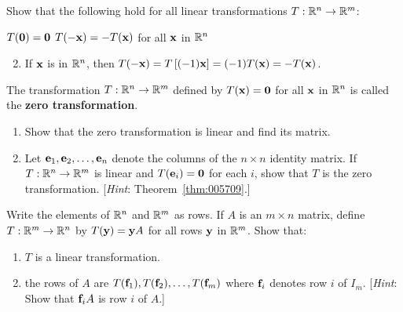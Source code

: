 \begin{multicols}{2}
\begin{ex}
Show that the following hold for all linear transformations $T : \mathbb{R}^n \to \mathbb{R}^m$:

\begin{exenumerate}[column-sep=-5em]
\exitem $T(\textbf{0}) = \textbf{0}$
\exitem $T(-\textbf{x}) = -T(\textbf{x})$ for all $\textbf{x}$ in $\mathbb{R}^n$
\end{exenumerate}
\begin{sol}
\begin{enumerate}[label={\alph*.}]
\setcounter{enumi}{1}
\item  If $\textbf{x}$ is in $\mathbb{R}^n$, then $T(-\textbf{x}) = T\left[(-1)\textbf{x}\right] = (-1)T(\textbf{x}) = -T(\textbf{x})$.

\end{enumerate}
\end{sol}
\end{ex}

\begin{ex}
The transformation $T : \mathbb{R}^n \to \mathbb{R}^m$ defined by $T(\textbf{x}) = \textbf{0}$ for all $\textbf{x}$ in $\mathbb{R}^n$ is called the \textbf{zero transformation}.

\begin{enumerate}[label={\alph*.}]
\item Show that the zero transformation is linear and find its matrix.

\item Let $\textbf{e}_{1}, \textbf{e}_{2}, \dots, \textbf{e}_{n}$ denote the columns of the $n \times n$ identity matrix. If $T : \mathbb{R}^n \to \mathbb{R}^m$ is linear and $T(\textbf{e}_{i}) = \textbf{0}$ for each $i$, show that $T$ is the zero transformation. [\textit{Hint}: Theorem~\ref{thm:005709}.]

\end{enumerate}
\end{ex}

\begin{ex}
Write the elements of $\mathbb{R}^n$ and $\mathbb{R}^m$ as rows. If $A$ is an $m \times n$ matrix, define $T : \mathbb{R}^m \to \mathbb{R}^n$ by $T(\textbf{y}) = \textbf{y}A$ for all rows $\textbf{y}$ in $\mathbb{R}^m$. Show that:

\begin{enumerate}[label={\alph*.}]
\item $T$ is a linear transformation.

\item the rows of $A$ are $T(\textbf{f}_{1}), T(\textbf{f}_{2}), \dots, T(\textbf{f}_{m})$ where $\textbf{f}_{i}$ denotes row $i$ of $I_{m}$. [\textit{Hint}: Show that $\textbf{f}_{i} A$ is row $i$ of $A$.]


\end{enumerate}
\end{ex}
\end{multicols}
